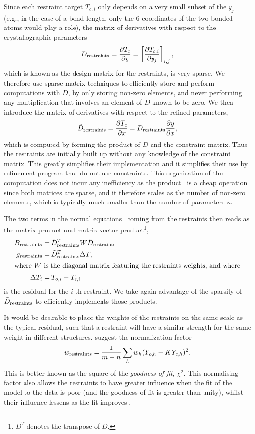 \documentclass[pdf]{iucr}
\begin{document}
Since each restraint target $T_{c,i}$ only depends on a very small subset of the $y_j$ (e.g., in the case of a bond length, only the 6 coordinates of the two bonded atoms would play a role), the matrix of derivatives with respect to the crystallographic parameters
\begin{equation}
D_{\text{restraints}} = \frac{\partial T_c}{\partial y} = \left[\frac{\partial T_{c,i}}{\partial y_j}\right]_{i,j},
\end{equation}
which is known as the design matrix for the restraints, is very sparse. We therefore use sparse matrix techniques to efficiently store and perform computations with $D$, by only storing non-zero elements, and never performing any multiplication that involves an element of $D$ known to be zero. We then introduce the matrix of derivatives with respect to the refined parameters,
\begin{equation}
\tilde{D}_{\text{restraints}} = \frac{\partial T_c}{\partial x} = D_{\text{restraints}} \frac{\partial y}{\partial x},
\label{eqn:constraints:applied:torestraints}
\end{equation}
which is computed by forming the product of $D$ and the constraint matrix. Thus the restraints are initially built up without any knowledge of the constraint matrix. This greatly simplifies their implementation and it simplifies their use by refinement program that do not use constraints. This organisation of the computation does not incur any inefficiency as the product~ is a cheap operation since both matrices are sparse, and it therefore scales as the number of non-zero elements, which is typically much smaller than the number of parameters $n$. 

The two terms in the normal equations~ coming from the restraints then reads as the matrix product and matrix-vector product\footnote{$D^T$ denotes the transpose of $D$.},
\begin{align}
B_{\text{restraints}} &= \tilde{D}_{\text{restraints}}^T W \tilde{D}_{\text{restraints}}\\
g_{\text{restraints}} &= \tilde{D}_{\text{restraints}}^T \Delta T,\\
\shortintertext{where $W$ is the diagonal matrix featuring the restraints weights, and where}
\Delta T_i &= T_{o,i} - T_{c,i}
\end{align}
is the residual for the $i$-th restraint. We take again advantage of the sparsity of $\tilde{D}_{\text{restraints}}$ to efficiently implements those products.

It would be desirable to place the weights of the restraints on the same scale as the typical residual, such that a restraint will have a similar strength for the same weight in different structures. \cite{Giacovazzo:2002aa} suggest the normalization factor
\begin{equation}
w_{\text{restraints}} = \frac{1}{m-n} \sum_{h}{ w_h (Y_{o,h} - K Y_{c,h})^2}.
\label{eqn:giacovazzo_normalisation}
\end{equation}
This is better known as the square of the \emph{goodness of fit}, $\chi^2$. This normalising factor also allows the restraints to have greater influence when the fit of the model to the data is poor (and the goodness of fit is greater than unity), whilst their influence lessens as the fit improves \cite{Sheldrick:1997aa}.
\end{document}
